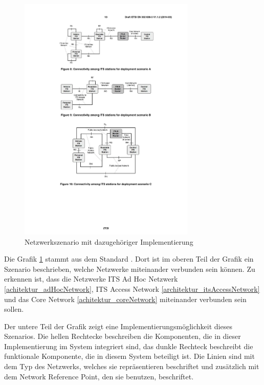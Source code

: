 \begin{figure}
	\includegraphics[width=0.75\textwidth]{content/images/02_architektur/verbindungenNetzwerkSzenario.pdf}
	\caption{Netzwerkszenario mit dazugehöriger Implementierung \cite{etsi302636-3}}
	\label{fig:architektur_netzwerkSzenario}
\end{figure}

Die Grafik \ref{fig:architektur_netzwerkSzenario} stammt aus dem Standard \cite{etsi302636-3}. Dort ist im oberen Teil der Grafik ein Szenario beschrieben, welche Netzwerke miteinander verbunden sein können.  Zu erkennen ist, dass die Netzwerke ITS Ad Hoc Netzwerk \ref{achitektur_adHocNetwork}, ITS Access Network \ref{architektur_itsAccessNetwork} und das Core Network  \ref{achitektur_coreNetwork} miteinander verbunden sein sollen.

Der untere Teil der Grafik zeigt eine Implementierungsmöglichkeit dieses Szenarios. Die hellen Rechtecke beschreiben die Komponenten, die in dieser Implementierung im System integriert sind, das dunkle Rechteck beschreibt die funktionale Komponente, die in diesem System beteiligt ist. Die Linien sind mit dem Typ des Netzwerks, welches sie repräsentieren beschriftet und zusätzlich mit dem Network Reference Point, den sie benutzen, beschriftet.


